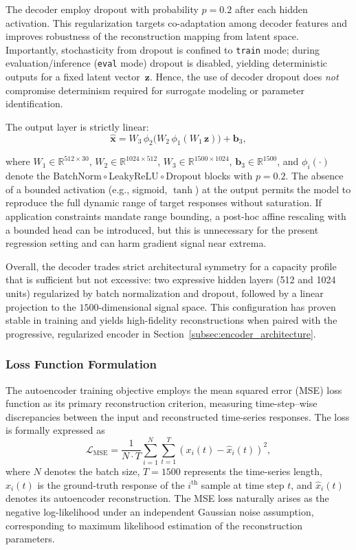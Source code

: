 \documentclass[12pt,a4paper]{report}
\begin{document}
The decoder  employ dropout with probability $p=0.2$ after each hidden activation. This regularization targets co-adaptation among decoder features and improves robustness of the reconstruction mapping from latent space. Importantly, stochasticity from dropout is confined to \texttt{train} mode; during evaluation/inference (\texttt{eval} mode) dropout is disabled, yielding deterministic outputs for a fixed latent vector~$\mathbf{z}$. Hence, the use of decoder dropout does \emph{not} compromise determinism required for surrogate modeling or parameter identification.

The output layer is strictly linear:
\begin{equation}
    \mathbf{\hat{x}} = W_3\,\phi_2\!\bigl(W_2\,\phi_1(W_1\,\mathbf{z})\bigr) + \mathbf{b}_3,
\end{equation}

where $W_1 \in \mathbb{R}^{512 \times 30}$, $W_2 \in \mathbb{R}^{1024 \times 512}$, $W_3 \in \mathbb{R}^{1500 \times 1024}$, $\mathbf{b}_3 \in \mathbb{R}^{1500}$, and $\phi_i(\cdot)$ denote the BatchNorm\,$\circ$\,LeakyReLU\,$\circ$\,Dropout blocks with $p=0.2$. The absence of a bounded activation (e.g., sigmoid, $\tanh$) at the output permits the model to reproduce the full dynamic range of target responses without saturation. If application constraints mandate range bounding, a post-hoc affine rescaling with a bounded head can be introduced, but this is unnecessary for the present regression setting and can harm gradient signal near extrema.

Overall, the decoder trades strict architectural symmetry for a capacity profile that is sufficient but not excessive: two expressive hidden layers (512 and 1024 units) regularized by batch normalization and dropout, followed by a linear projection to the $1500$-dimensional signal space. This configuration has proven stable in training and yields high-fidelity reconstructions when paired with the progressive, regularized encoder in Section~\ref{subsec:encoder_architecture}.


\subsubsection{Loss Function Formulation}
The autoencoder training objective employs the mean squared error (MSE) loss function as its primary reconstruction criterion, measuring time-step–wise discrepancies between the input and reconstructed time-series responses. The loss is formally expressed as
\[
\mathcal{L}_{\text{MSE}}
= \frac{1}{N \cdot T}
\sum_{i=1}^{N}
\sum_{t=1}^{T}
\left( x_i(t) - \hat{x}_i(t) \right)^2,
\]
where $N$ denotes the batch size, $T = 1500$ represents the time-series length, $x_i(t)$ is the ground-truth response of the $i^{\text{th}}$ sample at time step $t$, and $\hat{x}_i(t)$ denotes its autoencoder reconstruction. The MSE loss naturally arises as the negative log-likelihood under an independent Gaussian noise assumption, corresponding to maximum likelihood estimation of the reconstruction parameters.
\end{document}
